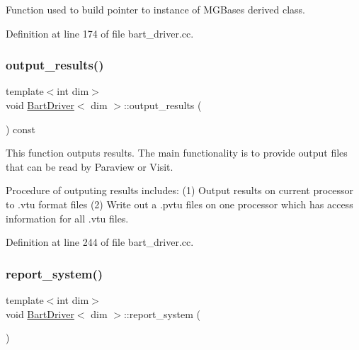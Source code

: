 Function used to build pointer to instance of M\+G\+Base\textquotesingle{}s derived class. 



Definition at line 174 of file bart\+\_\+driver.\+cc.

\mbox{\label{class_bart_driver_a1c440c9add7a5ec9d28afb7d44fa23d9}} 
\subsubsection{\texorpdfstring{output\+\_\+results()}{output\_results()}}
{\footnotesize\ttfamily template$<$int dim$>$ \\
void \hyperlink{class_bart_driver}{Bart\+Driver}$<$ dim $>$\+::output\+\_\+results (\begin{DoxyParamCaption}{ }\end{DoxyParamCaption}) const\hspace{0.3cm}{\ttfamily [private]}}

This function outputs results. The main functionality is to provide output files that can be read by Paraview or Visit.

Procedure of outputing results includes\+: (1) Output results on current processor to .vtu format files (2) Write out a .pvtu files on one processor which has access information for all .vtu files. 

Definition at line 244 of file bart\+\_\+driver.\+cc.

\mbox{\label{class_bart_driver_aaf3b0ad2798c9add9e37ca0f649c416d}} 
\subsubsection{\texorpdfstring{report\+\_\+system()}{report\_system()}}
{\footnotesize\ttfamily template$<$int dim$>$ \\
void \hyperlink{class_bart_driver}{Bart\+Driver}$<$ dim $>$\+::report\+\_\+system (\begin{DoxyParamCaption}{ }\end{DoxyParamCaption})\hspace{0.3cm}{\ttfamily [private]}}



